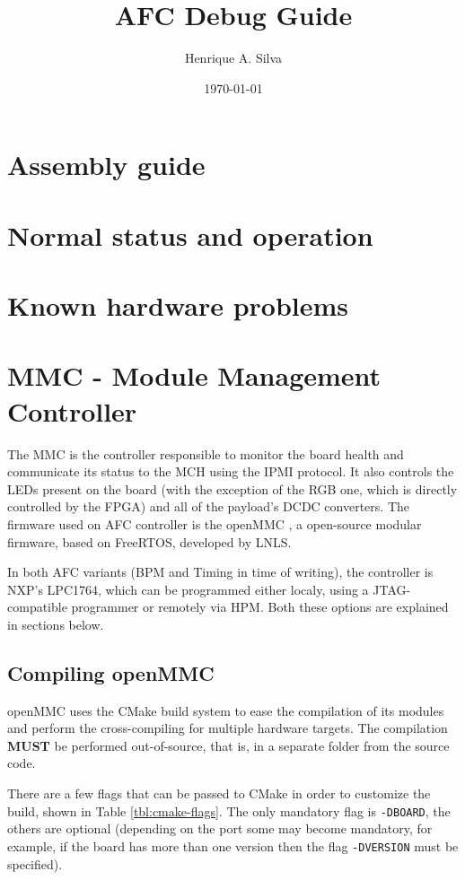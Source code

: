 \documentclass[letterpaper,12pt, titlepage]{article}
\begin{document}
\title{\bfseries \huge AFC Debug Guide}
\author{Henrique A. Silva}
\date{\today}
\maketitle

\tableofcontents
\newpage

\section{Assembly guide}

\section{Normal status and operation}

\section{Known hardware problems}

\section{MMC - Module Management Controller}

The MMC is the controller responsible to monitor the board health and communicate its status to the MCH using the IPMI protocol. It also controls the LEDs present on the board (with the exception of the RGB one, which is directly controlled by the FPGA) and all of the payload's DCDC converters.
The firmware used on AFC controller is the openMMC \cite{openmmc-github}, a open-source modular firmware, based on FreeRTOS, developed by LNLS.

In both AFC variants (BPM and Timing in time of writing), the controller is NXP's LPC1764, which can be programmed either localy, using a JTAG-compatible programmer or remotely via HPM. Both these options are explained in sections below.

\subsection{Compiling openMMC}
openMMC uses the CMake build system to ease the compilation of its modules and perform the cross-compiling for multiple hardware targets.
The compilation \textbf{MUST} be performed out-of-source, that is, in a separate folder from the source code.

There are a few flags that can be passed to CMake in order to customize the build, shown in Table \ref{tbl:cmake-flags}. The only mandatory flag is \texttt{-DBOARD}, the others are optional (depending on the port some may become mandatory, for example, if the board has more than one version then the flag \texttt{-DVERSION} must be specified).
\end{document}
